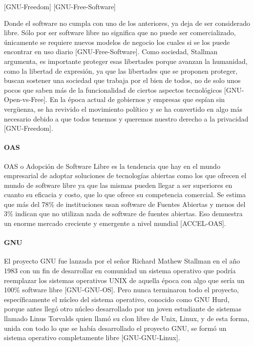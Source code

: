 [GNU-Freedom] [GNU-Free-Software]

Donde el software no cumpla con uno de los anteriores, ya deja de ser considerado libre. Sólo por ser software libre no significa que no puede ser comercializado, únicamente se requiere nuevos modelos de negocio los cuales si se los puede encontrar en uso diario [GNU-Free-Software]. Como sociedad, Stallman argumenta, es importante proteger esas libertades porque avanzan la humanidad, como la libertad de expresión, ya que las libertades que se proponen proteger, buscan sostener una sociedad que trabaja por el bien de todos, no de solo unos pocos que saben más de la funcionalidad de ciertos aspectos tecnológicos [GNU-Open-vs-Free]. En la época actual de gobiernos y empresas que espían sin vergüenza, se ha revivido el movimiento político y se ha convertido en algo más necesario debido a que todos tenemos y  queremos nuestro derecho a la privacidad [GNU-Freedom].

\paragraph{OAS}
OAS o Adopción de Software Libre es la tendencia que hay en el mundo empresarial de adoptar soluciones de tecnologías abiertas como los que ofrecen el mundo de software libre ya que las mismas pueden llegar a ser superiores en cuanto su eficacia y costo, que lo que ofrece su competencia comercial. Se estima que más del 78\% de instituciones usan software  de Fuentes Abiertas y menos del 3\% indican que no utilizan nada de software de fuentes abiertas. Eso demuestra un enorme mercado creciente y emergente a nivel mundial [ACCEL-OAS].

\paragraph{GNU}
El proyecto GNU fue lanzada por el señor Richard Mathew Stallman en el año 1983 con un fin de desarrollar en comunidad un sistema operativo que podría reemplazar los sistemas operativos UNIX de aquella época con algo que sería un 100\% software libre [GNU-GNU-OS]. Pero nunca terminaron todo el proyecto, específicamente el núcleo del sistema operativo, conocido como GNU Hurd, porque antes llegó otro núcleo desarrollado por un joven estudiante de sistemas llamado Linus Torvalds quien llamó su clon libre de Unix, Linux, y de esta forma, unida con todo lo que se había desarrollado el proyecto GNU, se formó un sistema operativo completamente libre [GNU-GNU-Linux].

